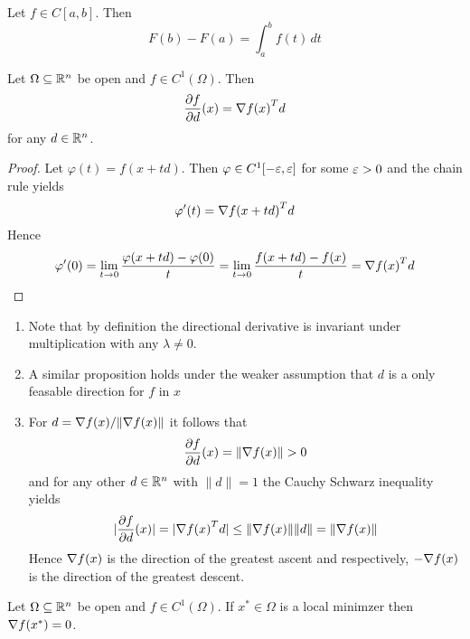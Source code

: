 \begin{theorem}\label{thm:fund_calculus}
Let \( f \in C[a,b] \). Then
\[
    F(b) -F(a) = \int_a^b f(t)\,dt
\]
\end{theorem}

\begin{lemma}\label{lemma:directional_derivative}
Let \( \Omega \subseteq \mathbb{R}^n \) be open and \( f \in C^1(\Omega) \). Then
\[
    \frac{\partial f}{\partial d}(x) = \nabla{f(x)}^T d
\]
for any \( d \in \mathbb{R}^n \).
\end{lemma}

\begin{proof}
Let \( \varphi(t) = f(x + td) \). Then \( \varphi \in C^1[-\varepsilon, \varepsilon ] \) for some \( \varepsilon > 0 \) 
and the chain rule yields 
\[ 
    \varphi^\prime(t) = {\nabla f(x + td)}^T d 
\]
Hence
\[
    \varphi^\prime(0) = \lim_{t \to 0} \frac{\varphi(x + td) - \varphi(0)}{t} = 
        \lim_{t \to 0} \frac{f(x + td) - f(x)}{t} = {\nabla f(x)}^T d
\]
\end{proof}
\bigskip

\begin{remark}\hfill
    \begin{enumerate}
        \item Note that by definition the directional derivative is invariant under multiplication 
            with any \( \lambda \ne 0 \).

        \item A similar proposition holds under the weaker assumption that \( d \) is a only feasable direction 
            for \( f \) in \( x \)

        \item For \( d = \nabla{f(x)}/\| \nabla{f(x)}\| \) it follows that
            \[
                \frac{\partial f}{\partial d}(x) = \|\nabla{f(x)}\| > 0
            \]
            and for any other \( d \in \mathbb{R}^n \) with \( \|d\| = 1 \) the Cauchy Schwarz inequality yields
            \[
                |\frac{\partial f}{\partial d}(x)| = |\nabla{f(x)}^T d| \le \|\nabla{f(x)}\| \|d\| = 
                    \|\nabla{f(x)}\|
            \]
            Hence \( \nabla{f(x)} \) is the direction of the greatest ascent and respectively, 
            \( -\nabla{f(x)} \) is the direction of the greatest descent.
    \end{enumerate}
\end{remark}
\bigskip

\begin{theorem}\label{thm:fonc}
Let \( \Omega \subseteq \mathbb{R}^n \) be open and \( f \in C^1(\Omega) \). If \( x^* \in \Omega \) is a local minimzer then
\( \nabla f(x^*) = 0 \).
\end{theorem}

